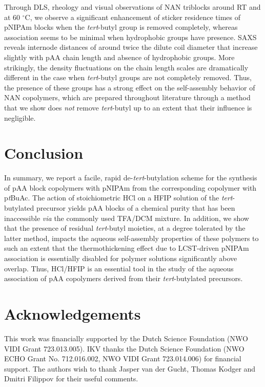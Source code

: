 \documentclass{article}
\begin{document}
Through DLS, rheology and visual observations of NAN triblocks around RT and at
60 $^\circ\mathrm{C}$, we observe a significant enhancement of sticker residence times 
of pNIPAm blocks 
when the \emph{tert}-butyl group is removed completely, whereas association seems to be minimal
when hydrophobic groups have presence. SAXS reveals internode distances of around twice the
dilute coil diameter that increase slightly with pAA chain length and absence of 
hydrophobic groups. More strikingly,
the density fluctuations on the chain length scales are dramatically different in the 
case when \emph{tert}-butyl groups are
not completely removed. Thus, the presence of these groups has a strong effect on the 
self-assembly behavior of NAN copolymers, 
which are prepared throughout literature through a method that we show does \emph{not} 
remove \emph{tert}-butyl up to an 
extent that their influence is negligible.

\section*{Conclusion}
In summary, we report a facile, rapid de-\emph{tert}-butylation scheme for the synthesis 
of pAA block copolymers 
with pNIPAm from the corresponding copolymer with p\emph{t}BuAc. The action of 
stoichiometric HCl on a HFIP solution
of the \emph{tert}-butylated precursor yields pAA blocks of a chemical purity that has been 
inaccessible \emph{via} the commonly used TFA/DCM mixture. In addition, we show that the 
presence of residual
\emph{tert}-butyl moieties, at a degree tolerated by the latter method, impacts the 
aqueous self-assembly properties 
of these polymers to such an extent that the thermothickening effect due to LCST-driven 
pNIPAm association is
essentially disabled for polymer solutions significantly above overlap. Thus, HCl/HFIP 
is an essential tool in the
study of the aqueous association of pAA copolymers derived from their \emph{tert}-butylated 
precursors.

\section*{Acknowledgements}
This work was financially supported by the Dutch Science Foundation (NWO VIDI Grant 723.013.005).
IKV thanks the Dutch Science Foundation (NWO ECHO Grant No. 712.016.002, NWO VIDI Grant 723.014.006) for
financial support. The authors wish to thank Jasper van der Gucht, Thomas Kodger and Dmitri Filippov
for their useful comments.
\end{document}
